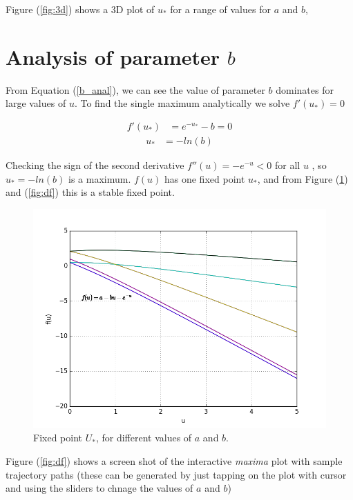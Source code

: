 \documentclass[a4paper]{article}
\begin{document}
Figure (\ref{fig:3d}) shows a 3D plot of $u_{*}$ for a range of values for $a$ and $b$, 

\newpage

\section{Analysis of parameter $b$}
From Equation (\ref{b_anal}), we can see the value of parameter $b$ dominates for large values of $u$. To find the single maximum analytically we solve $f'(u_{*}) = 0$

\begin{align*}
  f'(u_{*}) &= e^{-u_{*}} - b = 0 							
\end{align*}
\begin{align*}
  u_{*} &= -ln(b) 							
\end{align*}

Checking the sign of the second derivative $f''(u) = -e^{-u} < 0$ for all $u$ , so $u_{*} = -ln(b)$ is a maximum.
$f(u)$ has one fixed point $u_{*}$, and from Figure (\ref{fig:fp_diff_ab}) and (\ref{fig:df}) this is a stable fixed point.

\begin{figure}[H]
\label{yyy}
\centering
\includegraphics[width=1\textwidth]{fp_diff_ab.png}
\caption{\label{fig:fp_diff_ab}Fixed point $U_{*}$, for different values of $a$ and $b$.}
\end{figure}

Figure (\ref{fig:df}) shows a screen shot of the interactive \textit{maxima} plot with sample trajectory paths (these can be generated by just tapping on the plot with cursor and using the sliders to chnage the values of $a$ and $b$) 
\end{document}
